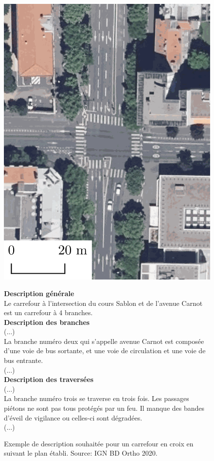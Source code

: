 \begin{figure}[ht]
    \begin{minipage}[b]{0.45\linewidth}
        \centering
        \includegraphics[width=0.8\linewidth]{images/experimentation/ortho_carrefour.png} 
    \end{minipage}
    \begin{minipage}[b]{0.45\linewidth}
        \footnotesize
        \textbf{Description générale}\\
        Le carrefour à l'intersection du cours Sablon et de l'avenue Carnot est un carrefour à 4 branches.\\
        \textbf{Description des branches}\\
        (...)\\
        La branche numéro deux qui s'appelle avenue Carnot est composée d'une voie de bus sortante, et une voie de circulation et une voie de bus entrante.\\
        (...)\\
        \textbf{Description des traversées}\\
        (...)\\
        La branche numéro trois se traverse en trois fois. Les passages piétons ne sont pas tous protégés par un feu. Il manque des bandes d'éveil de vigilance ou celles-ci sont dégradées.\\
        (...)
    \end{minipage}
    \caption[Exemple de description de carrefour]{Exemple de description souhaitée pour un carrefour en croix en suivant le plan établi. Source: IGN BD Ortho 2020.}
    \label{fig:experimentation_plan_description}
\end{figure}

